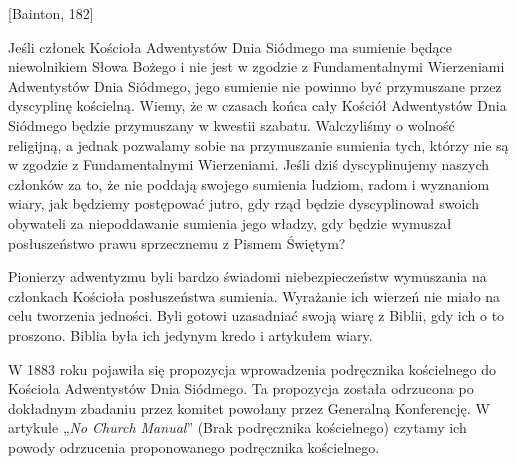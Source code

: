 [Bainton, 182]

Jeśli członek Kościoła Adwentystów Dnia Siódmego ma sumienie będące niewolnikiem Słowa Bożego i nie jest w zgodzie z Fundamentalnymi Wierzeniami Adwentystów Dnia Siódmego, jego sumienie nie powinno być przymuszane przez dyscyplinę kościelną. Wiemy, że w czasach końca cały Kościół Adwentystów Dnia Siódmego będzie przymuszany w kwestii szabatu. Walczyliśmy o wolność religijną, a jednak pozwalamy sobie na przymuszanie sumienia tych, którzy nie są w zgodzie z Fundamentalnymi Wierzeniami. Jeśli dziś dyscyplinujemy naszych członków za to, że nie poddają swojego sumienia ludziom, radom i wyznaniom wiary, jak będziemy postępować jutro, gdy rząd będzie dyscyplinował swoich obywateli za niepoddawanie sumienia jego władzy, gdy będzie wymuszał posłuszeństwo prawu sprzecznemu z Pismem Świętym?

Pionierzy adwentyzmu byli bardzo świadomi niebezpieczeństw wymuszania na członkach Kościoła posłuszeństwa sumienia. Wyrażanie ich wierzeń nie miało na celu tworzenia jedności. Byli gotowi uzasadniać swoją wiarę z Biblii, gdy ich o to proszono. Biblia była ich jedynym kredo i artykułem wiary.

W 1883 roku pojawiła się propozycja wprowadzenia podręcznika kościelnego do Kościoła Adwentystów Dnia Siódmego. Ta propozycja została odrzucona po dokładnym zbadaniu przez komitet powołany przez Generalną Konferencję. W artykule „\textit{No Church Manual}” (Brak podręcznika kościelnego) czytamy ich powody odrzucenia proponowanego podręcznika kościelnego.

